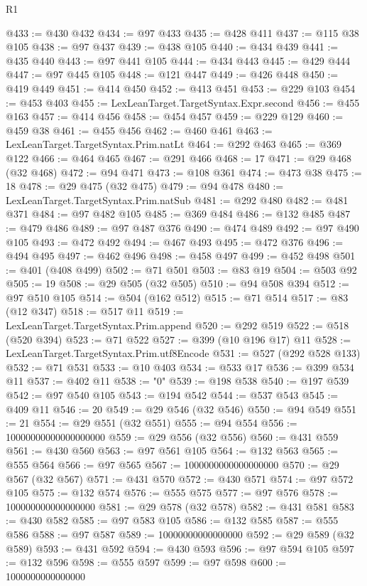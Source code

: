 \begin{lexlean}{R1}
\begin{coremodule}
@433 := @430 @432
@434 := @97 @433
@435 := @428 @411
@437 := @115 @38 @105
@438 := @97 @437
@439 := @438 @105
@440 := @434 @439
@441 := @435 @440
@443 := @97 @441 @105
@444 := @434 @443
@445 := @429 @444
@447 := @97 @445 @105
@448 := @121 @447
@449 := @426 @448
@450 := @419 @449
@451 := @414 @450
@452 := @413 @451
@453 := @229 @103
@454 := @453 @403
@455 := LexLeanTarget.TargetSyntax.Expr.second
@456 := @455 @163
@457 := @414 @456
@458 := @454 @457
@459 := @229 @129
@460 := @459 @38
@461 := @455 @456
@462 := @460 @461
@463 := LexLeanTarget.TargetSyntax.Prim.natLt
@464 := @292 @463
@465 := @369 @122
@466 := @464 @465
@467 := @291 @466
@468 := 17
@471 := @29 @468 (@32 @468)
@472 := @94 @471
@473 := @108 @361
@474 := @473 @38
@475 := 18
@478 := @29 @475 (@32 @475)
@479 := @94 @478
@480 := LexLeanTarget.TargetSyntax.Prim.natSub
@481 := @292 @480
@482 := @481 @371
@484 := @97 @482 @105
@485 := @369 @484
@486 := @132 @485
@487 := @479 @486
@489 := @97 @487 @376
@490 := @474 @489
@492 := @97 @490 @105
@493 := @472 @492
@494 := @467 @493
@495 := @472 @376
@496 := @494 @495
@497 := @462 @496
@498 := @458 @497
@499 := @452 @498
@501 := @401 (@408 @499)
@502 := @71 @501
@503 := @83 @19
@504 := @503 @92
@505 := 19
@508 := @29 @505 (@32 @505)
@510 := @94 @508 @394
@512 := @97 @510 @105
@514 := @504 (@162 @512)
@515 := @71 @514
@517 := @83 (@12 @347)
@518 := @517 @11
@519 := LexLeanTarget.TargetSyntax.Prim.append
@520 := @292 @519
@522 := @518 (@520 @394)
@523 := @71 @522
@527 := @399 (@10 @196 @17) @11
@528 := LexLeanTarget.TargetSyntax.Prim.utf8Encode
@531 := @527 (@292 @528 @133)
@532 := @71 @531
@533 := @10 @403
@534 := @533 @17
@536 := @399 @534 @11
@537 := @402 @11
@538 := "0"
@539 := @198 @538
@540 := @197 @539
@542 := @97 @540 @105
@543 := @194 @542
@544 := @537 @543
@545 := @409 @11
@546 := 20
@549 := @29 @546 (@32 @546)
@550 := @94 @549
@551 := 21
@554 := @29 @551 (@32 @551)
@555 := @94 @554
@556 := 10000000000000000000
@559 := @29 @556 (@32 @556)
@560 := @431 @559
@561 := @430 @560
@563 := @97 @561 @105
@564 := @132 @563
@565 := @555 @564
@566 := @97 @565
@567 := 1000000000000000000
@570 := @29 @567 (@32 @567)
@571 := @431 @570
@572 := @430 @571
@574 := @97 @572 @105
@575 := @132 @574
@576 := @555 @575
@577 := @97 @576
@578 := 100000000000000000
@581 := @29 @578 (@32 @578)
@582 := @431 @581
@583 := @430 @582
@585 := @97 @583 @105
@586 := @132 @585
@587 := @555 @586
@588 := @97 @587
@589 := 10000000000000000
@592 := @29 @589 (@32 @589)
@593 := @431 @592
@594 := @430 @593
@596 := @97 @594 @105
@597 := @132 @596
@598 := @555 @597
@599 := @97 @598
@600 := 1000000000000000

\end{coremodule}
\end{lexlean}

